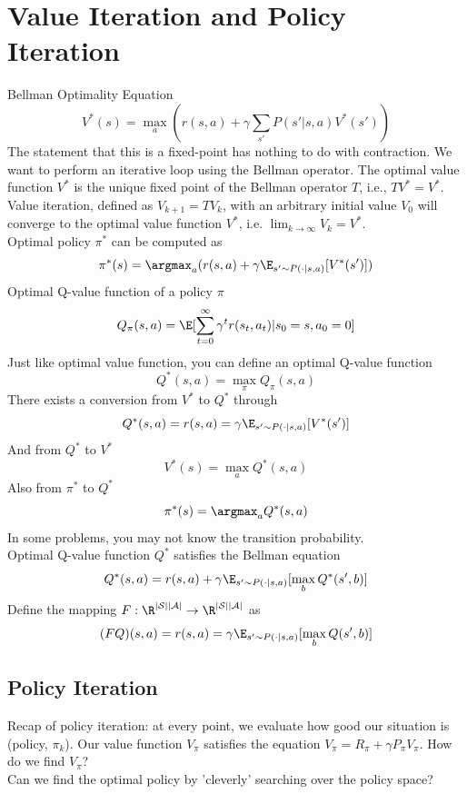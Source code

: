 \chapter{Value Iteration and Policy Iteration}


Bellman Optimality Equation
\[
    V^*(s) = \max_{a} \left( r(s, a) + \gamma \sum_{s'} P(s' | s,a) V^*(s') \right)
\]
The statement that this is a fixed-point has nothing to do with contraction. We want to perform an iterative loop using the Bellman operator. The optimal value function $V^*$ is the unique fixed point of the Bellman operator $T$, i.e., $TV^* = V^*$. Value iteration, defined as $V_{k+1}=TV_k$, with an arbitrary initial value $V_0$ will converge to the optimal value function $V^*$, i.e. $\lim_{k\to\infty} V_k = V^*$.  \\

Optimal policy $\pi^*$ can be computed as
\[
    \pi^*(s) = \argmax_{a} (r(s,a) + \gamma \E_{s'\sim P(\cdot | s,a)}[V^*(s')])
\]
Optimal Q-value function of a policy $\pi$
\[
    Q_\pi(s,a) = \E [\sum_{t=0}^{\infty} \gamma^t r(s_t, a_t) | s_0 = s, a_0 = 0]
\]
Just like optimal value function, you can define an optimal Q-value function
\[
    Q^* (s, a) = \max_{\pi} Q_\pi (s,a)
\]
There exists a conversion from $V^*$ to $Q^*$ through
\[
    Q^*(s,a) = r(s,a) = \gamma \E_{s'\sim P(\cdot | s,a)} [V^*(s')]
\]
And from $Q^*$ to $V^*$
\[
    V^*(s) = \max_{a}Q^* (s, a)
\]
Also from $\pi^*$ to $Q^*$
\[
    \pi^*(s) = \argmax_{a} Q^*(s, a)
\]
In some problems, you may not know the transition probability. \\

Optimal Q-value function $Q^*$ satisfies the Bellman equation
\[
    Q^*(s, a) = r(s,a) + \gamma \E_{s'\sim P(\cdot| s,a)} [\max_{b} Q^*(s',b)]
\]
Define the mapping $F: \R^{|\mathcal{S}||\mathcal{A}|} \to \R^{|\mathcal{S}||\mathcal{A}|}$ as
\[
    (FQ)(s, a) = r(s,a) = \gamma \E_{s'\sim P(\cdot | s,a)} [\max_{b} Q(s', b)]
\]
\section{Policy Iteration}

Recap of policy iteration: at every point, we evaluate how good our situation is (policy, $\pi_k$). Our value function $V_\pi$ satisfies the equation $V_\pi = R_\pi + \gamma P_\pi V_\pi$. How do we find $V_\pi$? \\

Can we find the optimal policy by 'cleverly' searching over the policy space? \\

